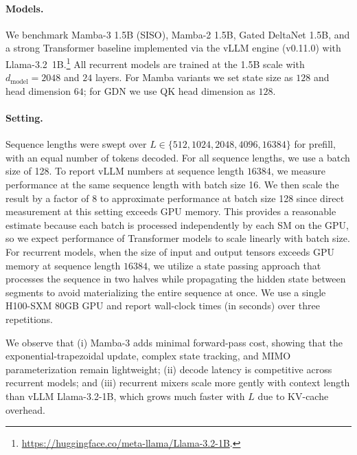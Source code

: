\documentclass{article}
\theoremstyle{plain}
\theoremstyle{definition}
\theoremstyle{remark}
\begin{document}
\paragraph{Models.}
We benchmark Mamba-3 1.5B (SISO), Mamba-2 1.5B, Gated DeltaNet 1.5B, and a strong Transformer baseline implemented via the vLLM engine (v0.11.0) with Llama-3.2~1B.\footnote{\url{https://huggingface.co/meta-llama/Llama-3.2-1B}.}  
All recurrent models are trained at the 1.5B scale with $d_{\text{model}} = 2048$ and $24$ layers. For Mamba variants we set state size as $128$ and head dimension $64$; for GDN we use QK head dimension as $128$.  

\paragraph{Setting.}

Sequence lengths were swept over $L \in \{512, 1024, 2048, 4096, 16384\}$ for prefill, with an equal number of tokens decoded.
For all sequence lengths, we use a batch size of 128. To report vLLM numbers at sequence length $16384$, we measure performance at the same sequence length with batch size 16.
We then scale the result by a factor of 8 to approximate performance at batch size 128 since direct measurement at this setting exceeds GPU memory.
This provides a reasonable estimate because each batch is processed independently by each SM on the GPU, so we expect performance of Transformer models to scale linearly with batch size.
For recurrent models, when the size of input and output tensors exceeds GPU memory at sequence length $16384$, we utilize a state passing approach that processes the sequence in two halves while propagating the hidden state between segments to avoid materializing the entire sequence at once.
We use a single H100-SXM 80GB GPU and report wall-clock times (in seconds) over three repetitions.

We observe that (i) Mamba-3 adds minimal forward-pass cost, showing that the exponential-trapezoidal update, complex state tracking, and MIMO parameterization remain lightweight; (ii) decode latency is competitive across recurrent models; and (iii) recurrent mixers scale more gently with context length than vLLM Llama-3.2-1B, which grows much faster with $L$ due to KV-cache overhead.
\end{document}
